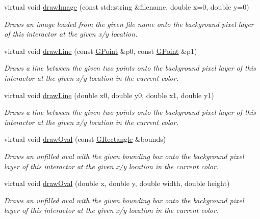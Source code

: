 \begin{DoxyCompactItemize}
virtual void \mbox{\hyperlink{classsgl_1_1GDrawingSurface_abdd4cb1f2c64adc5d03522a1ee30febf}{draw\+Image}} (const std\+::string \&filename, double x=0, double y=0)
\begin{DoxyCompactList}\small\item\em Draws an image loaded from the given file name onto the background pixel layer of this interactor at the given x/y location. \end{DoxyCompactList}\item 
virtual void \mbox{\hyperlink{classsgl_1_1GDrawingSurface_ae6a24b6b9a6e795d3165c1c750d5bdf1}{draw\+Line}} (const \mbox{\hyperlink{structsgl_1_1GPoint}{G\+Point}} \&p0, const \mbox{\hyperlink{structsgl_1_1GPoint}{G\+Point}} \&p1)
\begin{DoxyCompactList}\small\item\em Draws a line between the given two points onto the background pixel layer of this interactor at the given x/y location in the current color. \end{DoxyCompactList}\item 
virtual void \mbox{\hyperlink{classsgl_1_1GDrawingSurface_aff299fe83178d2f3ce8c08c06b583484}{draw\+Line}} (double x0, double y0, double x1, double y1)
\begin{DoxyCompactList}\small\item\em Draws a line between the given two points onto the background pixel layer of this interactor at the given x/y location in the current color. \end{DoxyCompactList}\item 
virtual void \mbox{\hyperlink{classsgl_1_1GDrawingSurface_a8adc13027efe311b4a6a715205b8bc46}{draw\+Oval}} (const \mbox{\hyperlink{structsgl_1_1GRectangle}{G\+Rectangle}} \&bounds)
\begin{DoxyCompactList}\small\item\em Draws an unfilled oval with the given bounding box onto the background pixel layer of this interactor at the given x/y location in the current color. \end{DoxyCompactList}\item 
virtual void \mbox{\hyperlink{classsgl_1_1GDrawingSurface_aa5b1cf902e578907da3c63060686354e}{draw\+Oval}} (double x, double y, double width, double height)
\begin{DoxyCompactList}\small\item\em Draws an unfilled oval with the given bounding box onto the background pixel layer of this interactor at the given x/y location in the current color. \end{DoxyCompactList}\item 

\end{DoxyCompactItemize}
